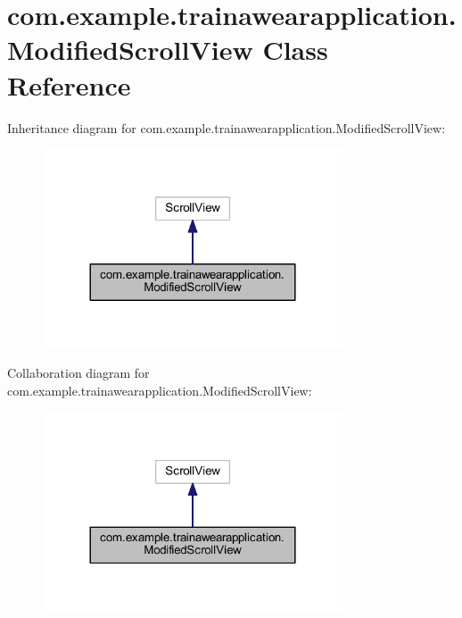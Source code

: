\hypertarget{classcom_1_1example_1_1trainawearapplication_1_1_modified_scroll_view}{}\section{com.\+example.\+trainawearapplication.\+Modified\+Scroll\+View Class Reference}
\label{classcom_1_1example_1_1trainawearapplication_1_1_modified_scroll_view}


Inheritance diagram for com.\+example.\+trainawearapplication.\+Modified\+Scroll\+View\+:
\nopagebreak
\begin{figure}[H]
\begin{center}
\leavevmode
\includegraphics[width=252pt]{classcom_1_1example_1_1trainawearapplication_1_1_modified_scroll_view__inherit__graph}
\end{center}
\end{figure}


Collaboration diagram for com.\+example.\+trainawearapplication.\+Modified\+Scroll\+View\+:
\nopagebreak
\begin{figure}[H]
\begin{center}
\leavevmode
\includegraphics[width=252pt]{classcom_1_1example_1_1trainawearapplication_1_1_modified_scroll_view__coll__graph}
\end{center}
\end{figure}
